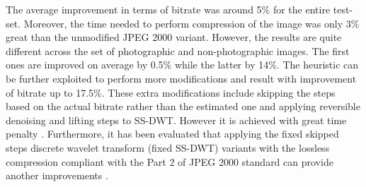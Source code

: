 The average improvement in terms of bitrate was around 5\% for the entire test-set. Moreover,
the time needed to perform compression of the image was only 3\% great than the unmodified JPEG 2000
variant. However, the results are quite different across the set of photographic and non-photographic
images. The first ones are improved on average by 0.5\% while the latter by 14\%. The heuristic can
be further exploited to perform more modifications and result with improvement of bitrate up to 17.5\%.
These extra modifications include skipping the steps based on the actual bitrate rather than the
estimated one and applying reversible denoising and lifting steps to SS-DWT. However it is achieved with
great time penalty \cite{skipping_dwt}.
Furthermore, it has been evaluated that applying the fixed skipped steps discrete wavelet
transform (fixed SS-DWT) variants with the lossless compression compliant with the Part 2
of JPEG 2000 standard can provide another improvements \cite{practical_dwt}.
